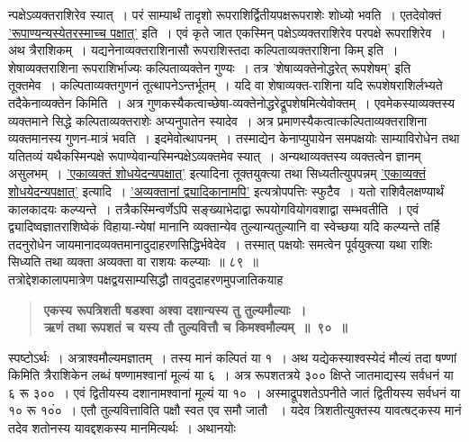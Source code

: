 \documentclass[11pt, openany]{book}
\begin{document}
\newpage

\begin{sloppypar}
\noindent न्पक्षेऽव्यक्तराशिरेव स्यात्~। परं साम्यार्थं तादृशो रूपराशिर्द्वितीयपक्षरूपराशेः शोध्यो भवति~। एतदेवोक्तं \hyperref[7.89]{'रूपाण्यन्यस्येतरस्माच्च पक्षात्'} इति~। एवं कृते जात एकस्मिन् पक्षेऽव्यक्तराशिरेव परपक्षे रूपराशिरेव~।\\

अथ त्रैराशिकम्~। यद्यनेनाव्यक्तराशिनासौ रूपराशिस्तदा कल्पिताव्यक्तराशिना किम् इति~। शेषाव्यक्तराशिना रूपराशिर्भाज्यः कल्पिताव्यक्तेन गुण्यः~। तत्र 'शेषाव्यक्तेनोद्धरेत् रूपशेषम्' इति तूक्तमेव~। कल्पिताव्यक्तगुणनं तूत्थापनेऽन्तर्भूतम्~। यदि वा शेषाव्यक्त-राशिना यदि रूपशेषराशिर्लभ्यते तदैकेनाव्यक्तेन किमिति~। अत्र गुणकस्यैकत्वाच्छेषा-व्यक्तेनोद्धरेद्रूपशेषमित्येवोक्तम्~। एवमेकस्याव्यक्तस्य व्यक्तमाने सिद्धे कल्पिताव्यक्तराशेः अप्यनुपातेन स्यादेव~। अत्र प्रमाणस्यैकत्वात्कल्पिताव्यक्तराशिना व्यक्तमानस्य गुणन-मात्रं भवति~। इदमेवोत्थापनम्~। तस्माद्येन केनाप्युपायेन समपक्षयोः साम्याविरोधेन तथा यतितव्यं यथैकस्मिन्पक्षे रूपाण्येवान्यस्मिन्पक्षेऽव्यक्तमेव स्यात्~। अन्यथाव्यक्तस्य व्यक्तत्वेन ज्ञानम् असुलभम्~। \hyperref[7.89]{'एकाव्यक्तं शोधयेदन्यपक्षात्'} इत्यादिना तूक्तयुक्त्या तथा सिध्यतीत्युपपन्नम् \hyperref[7.89]{'एकाव्यक्तं शोधयेदन्यपक्षात्'} इत्यादि~। \hyperref[7.89]{'अव्यक्तानां द्व्यादिकानामपि'} इत्यत्रोपपत्तिः स्फुटैव~। यतो राशिवैलक्षण्यार्थं कालकादयः कल्प्यन्ते~। तत्रैकस्मिन्वर्णेऽपि सङ्ख्याभेदाद्वा रूपयोगवियोगवशाद्वा सम्भवतीति~। एवं द्व्यादिष्वज्ञातराशिष्वेकं विहाया-न्येषां मानानि व्यक्तान्येव तुल्यान्यतुल्यानि वा स्वेच्छया यदि कल्प्यन्ते तर्हि तदनुरोधेन जायमानादव्यक्तमानादुदाहरणसिद्धिर्भवेदेव~। तस्मात् पक्षयोः समत्वेन पूर्वयुक्त्या यथा राशिः सिध्यति तथा व्यक्ता अव्यक्ता वा राशयः कल्प्याः~॥ ८९~॥\\

{\small तत्रोद्देशकालापमात्रेण पक्षद्वयसाम्यसिद्धौ तावदुदाहरणमुपजातिकयाह\textendash }

 \label{7.90}
\begin{quote}
{\large \textbf{{\color{purple}एकस्य रूपत्रिशती षडश्वा अश्वा दशान्यस्य तु तुल्यमौल्याः~।\\
ऋणं तथा रूपशतं च यस्य तौ तुल्यवित्तौ च किमश्वमौल्यम्~॥~९०~॥}}}
\end{quote}

स्पष्टोऽर्थः~। अत्राश्वमौल्यमज्ञातम्~। तस्य मानं कल्पितं या १~। अथ यद्येकस्याश्वस्येदं मौल्यं तदा षण्णां किमिति त्रैराशिकेन लब्धं षण्णामश्वानां मूल्यं या ६~। अत्र रूपशतत्रये ३०० क्षिप्ते जातमाद्यस्य सर्वधनं या ६ रू ३००~। एवं द्वितीयस्य दशानामश्वानां मूल्यं या १०~। अस्माद्रूपशतेऽपनीते जातं द्वितीयस्य सर्वधनं या १० रू १०ं०~। एतौ तुल्यवित्ताविति पक्षौ स्वत एव समौ जातौ ~। यदेव त्रिशतीत्युक्तस्य यावत्षट्कस्य मानं तदेव शतोनस्य यावद्दशकस्य मानमित्यर्थः~। अथानयोः
\end{sloppypar}
\end{document}
